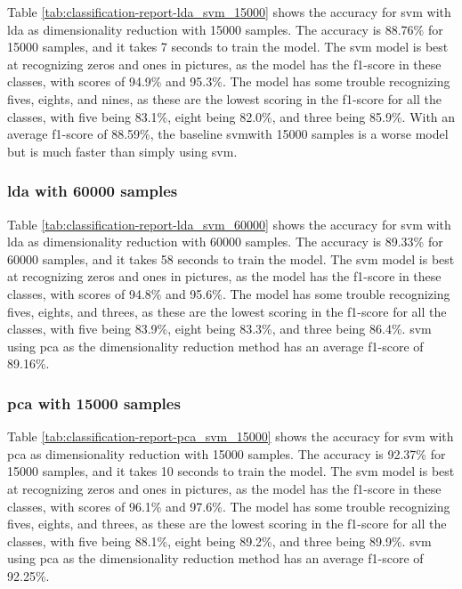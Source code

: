 Table \ref{tab:classification-report-lda_svm_15000} shows the accuracy for \gls{svm} with \gls{lda} as dimensionality reduction with 15000 samples. The accuracy is 88.76\% for 15000 samples, and it takes 7 seconds to train the model. The \gls{svm} model is best at recognizing zeros and ones in pictures, as the model has the f1-score in these classes, with scores of 94.9\% and 95.3\%. The model has some trouble recognizing fives, eights, and nines, as these are the lowest scoring in the f1-score for all the classes, with five being 83.1\%, eight being 82.0\%, and three being 85.9\%. With an average f1-score of 88.59\%, the baseline \gls{svm}with 15000 samples is a worse model but is much faster than simply using \gls{svm}.

\subsubsection{\gls{lda} with 60000 samples}\label{subsubsec:experiment-1-results-lda-60000}

Table \ref{tab:classification-report-lda_svm_60000} shows the accuracy for \gls{svm} with \gls{lda} as dimensionality reduction with 60000 samples. The accuracy is 89.33\% for 60000 samples, and it takes 58 seconds to train the model. The \gls{svm} model is best at recognizing zeros and ones in pictures, as the model has the f1-score in these classes, with scores of 94.8\% and 95.6\%. The model has some trouble recognizing fives, eights, and threes, as these are the lowest scoring in the f1-score for all the classes, with five being 83.9\%, eight being 83.3\%, and three being 86.4\%. \gls{svm} using \gls{pca} as the dimensionality reduction method has an average f1-score of 89.16\%.

\subsubsection{\gls{pca} with 15000 samples}\label{subsubsec:experiment-1-results-pca-15000}

Table \ref{tab:classification-report-pca_svm_15000} shows the accuracy for \gls{svm} with \gls{pca} as dimensionality reduction with 15000 samples. The accuracy is 92.37\% for 15000 samples, and it takes 10 seconds to train the model. The \gls{svm} model is best at recognizing zeros and ones in pictures, as the model has the f1-score in these classes, with scores of 96.1\% and 97.6\%. The model has some trouble recognizing fives, eights, and threes, as these are the lowest scoring in the f1-score for all the classes, with five being 88.1\%, eight being 89.2\%, and three being 89.9\%. \gls{svm} using \gls{pca} as the dimensionality reduction method has an average f1-score of 92.25\%.

